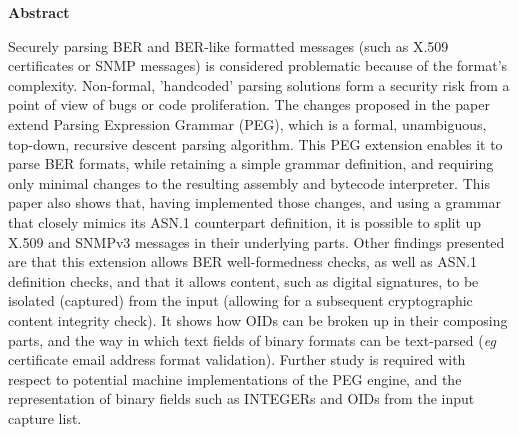 \textbf{Abstract}

Securely parsing BER and BER-like formatted messages
(such as X.509 certificates or
SNMP messages) is considered problematic because of the format's complexity.
Non-formal, 'handcoded' parsing solutions form a security risk from a
point of view of bugs or code proliferation. The changes proposed in the
paper extend Parsing Expression Grammar
(PEG), which is a formal, unambiguous, top-down, recursive descent
parsing algorithm.
This PEG extension enables it to parse BER formats, while retaining a
simple grammar definition, and requiring only minimal changes to the
resulting assembly and bytecode interpreter. This paper also shows that,
having implemented those changes, and using a grammar that closely mimics
its ASN.1 counterpart definition, it is possible to split up X.509 and SNMPv3
messages in their underlying parts. Other findings presented
are that this extension allows BER well-formedness checks, as well as ASN.1
definition checks, and that it allows content, such as digital
signatures, to be isolated (captured) from the input (allowing for a subsequent
cryptographic content integrity check). It shows how OIDs
can be broken up in their composing parts, and the way in which text
fields of binary formats can be text-parsed (\textit{eg} certificate
email address format validation).
Further study is required with respect to potential machine
implementations of the PEG engine, and the representation of binary
fields such as INTEGERs and OIDs from the input capture list.
